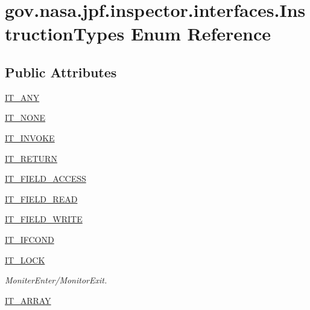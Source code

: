 \hypertarget{enumgov_1_1nasa_1_1jpf_1_1inspector_1_1interfaces_1_1_instruction_types}{}\section{gov.\+nasa.\+jpf.\+inspector.\+interfaces.\+Instruction\+Types Enum Reference}
\label{enumgov_1_1nasa_1_1jpf_1_1inspector_1_1interfaces_1_1_instruction_types}
\subsection*{Public Attributes}
\begin{DoxyCompactItemize}
\item 
\hyperlink{enumgov_1_1nasa_1_1jpf_1_1inspector_1_1interfaces_1_1_instruction_types_aad3f4c8aaddc54deef4cdfb64608db7c}{I\+T\+\_\+\+A\+NY}
\item 
\hyperlink{enumgov_1_1nasa_1_1jpf_1_1inspector_1_1interfaces_1_1_instruction_types_abf9c9b21c4c2e4711034843f22ce87b1}{I\+T\+\_\+\+N\+O\+NE}
\item 
\hyperlink{enumgov_1_1nasa_1_1jpf_1_1inspector_1_1interfaces_1_1_instruction_types_a5b4f945866dcdd7e7548ce02f07006da}{I\+T\+\_\+\+I\+N\+V\+O\+KE}
\item 
\hyperlink{enumgov_1_1nasa_1_1jpf_1_1inspector_1_1interfaces_1_1_instruction_types_a1a5b50e97394017242d8cbe01b27a4e5}{I\+T\+\_\+\+R\+E\+T\+U\+RN}
\item 
\hyperlink{enumgov_1_1nasa_1_1jpf_1_1inspector_1_1interfaces_1_1_instruction_types_aa5ef644e24690408122e2216e2e24f7d}{I\+T\+\_\+\+F\+I\+E\+L\+D\+\_\+\+A\+C\+C\+E\+SS}
\item 
\hyperlink{enumgov_1_1nasa_1_1jpf_1_1inspector_1_1interfaces_1_1_instruction_types_adf7e71e2b3ff117cb4673b983a268c14}{I\+T\+\_\+\+F\+I\+E\+L\+D\+\_\+\+R\+E\+AD}
\item 
\hyperlink{enumgov_1_1nasa_1_1jpf_1_1inspector_1_1interfaces_1_1_instruction_types_aea0e9f73d1bcf1eb7e7b1f171c55b73c}{I\+T\+\_\+\+F\+I\+E\+L\+D\+\_\+\+W\+R\+I\+TE}
\item 
\hyperlink{enumgov_1_1nasa_1_1jpf_1_1inspector_1_1interfaces_1_1_instruction_types_a7bb1eff83708000eebc39d35dacf5777}{I\+T\+\_\+\+I\+F\+C\+O\+ND}
\item 
\hyperlink{enumgov_1_1nasa_1_1jpf_1_1inspector_1_1interfaces_1_1_instruction_types_a5bb2a0156a6c9ba0e8aebfb6938585b8}{I\+T\+\_\+\+L\+O\+CK}
\begin{DoxyCompactList}\small\item\em Moniter\+Enter/\+Monitor\+Exit. \end{DoxyCompactList}\item 
\hyperlink{enumgov_1_1nasa_1_1jpf_1_1inspector_1_1interfaces_1_1_instruction_types_aea2b6d85109ce1f26ad9f80c9fb4d56d}{I\+T\+\_\+\+A\+R\+R\+AY}
\end{DoxyCompactItemize}


